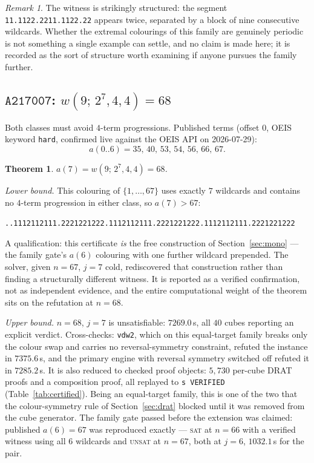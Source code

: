 \documentclass[12pt]{article}
\newtheorem{theorem}{Theorem}
\theoremstyle{remark}
\newtheorem{remark}{Remark}
\newcommand{\seq}[1]{\texttt{#1}}
\begin{document}
\begin{remark}
The witness is strikingly structured: the segment
\texttt{11.1122.2211.1122.22} appears twice, separated by a block of nine
consecutive wildcards. Whether the extremal colourings of this family are
genuinely periodic is not something a single example can settle, and no claim
is made here; it is recorded as the sort of structure worth examining if
anyone pursues the family further.
\end{remark}

\subsection{$\seq{A217007}$: $w(9;\,2^{7},4,4)=68$}\label{sec:a217007}

Both classes must avoid $4$-term progressions. Published terms (offset $0$,
OEIS keyword \texttt{hard}, confirmed live against the OEIS API on
2026-07-29):
\[
a(0..6) = 35,\,40,\,53,\,54,\,56,\,66,\,67 .
\]

\begin{theorem}\label{thm:a217007}
$a(7) = w(9;\,2^{7},4,4) = 68$.
\end{theorem}

\emph{Lower bound.} This colouring of $\{1,\dots,67\}$ uses exactly $7$
wildcards and contains no $4$-term progression in either class, so
$a(7) > 67$:

\begin{center}\small
\texttt{..1112112111.2221221222.1112112111.2221221222.1112112111.2221221222}
\end{center}

A qualification: this certificate \emph{is} the free construction of
Section~\ref{sec:mono} --- the family gate's $a(6)$ colouring with one
further wildcard prepended. The solver, given $n=67$, $j=7$ cold,
rediscovered that construction rather than finding a structurally different
witness. It is reported as a verified confirmation, not as independent
evidence, and the entire computational weight of the theorem sits on the
refutation at $n=68$.

\emph{Upper bound.} $n=68$, $j=7$ is unsatisfiable: $7269.0$\,s, all $40$
cubes reporting an explicit verdict. Cross-checks: \texttt{vdw2}, which on
this equal-target family breaks only the colour swap and carries no
reversal-symmetry constraint, refuted the instance in $7375.6$\,s, and the
primary engine with reversal symmetry switched off refuted it in
$7285.2$\,s. It is also reduced to checked proof objects: $5{,}730$ per-cube
DRAT proofs and a composition proof, all replayed to \texttt{s VERIFIED}
(Table~\ref{tab:certified}). Being an equal-target family, this is one of the
two that the colour-symmetry rule of Section~\ref{sec:drat} blocked until it
was removed from the cube generator. The family gate passed before the extension was claimed:
published $a(6)=67$ was reproduced
exactly --- \textsc{sat} at $n=66$ with a verified witness using all $6$
wildcards and \textsc{unsat} at $n=67$, both at $j=6$, $1032.1$\,s for the
pair.
\end{document}
